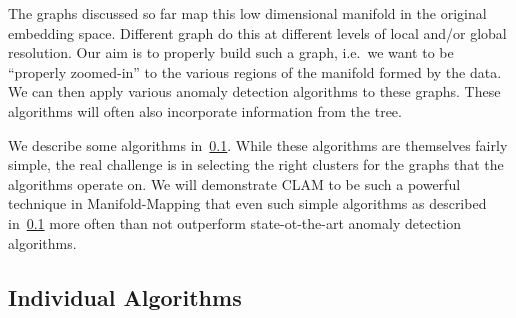 The graphs discussed so far map this low dimensional manifold in the original embedding space.
Different graph do this at different levels of local and/or global resolution.
Our aim is to properly build such a graph, i.e.\ we want to be ``properly zoomed-in'' to the various regions of the manifold formed by the data.
We can then apply various anomaly detection algorithms to these graphs.
These algorithms will often also incorporate information from the tree.

We describe some algorithms in~\ref{subsec:methodology:individual-algorithms}.
While these algorithms are themselves fairly simple, the real challenge is in selecting the right clusters for the graphs that the algorithms operate on.
We will demonstrate CLAM to be such a powerful technique in Manifold-Mapping that even such simple algorithms as described in~\ref{subsec:methodology:individual-algorithms} more often than not outperform state-ot-the-art anomaly detection algorithms.

\subsection{Individual Algorithms}
\label{subsec:methodology:individual-algorithms}




